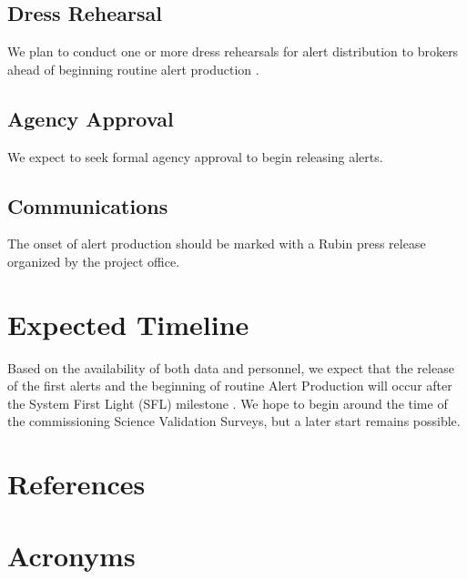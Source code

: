 \documentclass[OPS,authoryear,toc]{lsstdoc}
\begin{document}
\subsection{Dress Rehearsal}

We plan to conduct one or more dress rehearsals for alert distribution to brokers ahead of beginning routine alert production .

\subsection{Agency Approval}

We expect to seek formal agency approval to begin releasing alerts.

\subsection{Communications}

The onset of alert production should be marked with a Rubin press release organized by the project office.

\section{Expected Timeline}

Based on the availability of both data and personnel, we expect that the release of the first alerts and the beginning of routine Alert Production will occur after the System First Light (SFL) milestone . 
We hope to begin around the time of the commissioning Science Validation Surveys, but a later start remains possible.



\appendix
\section{References} \label{sec:bib}
\renewcommand{\refname}{} %


\section{Acronyms} \label{sec:acronyms}

\end{document}
